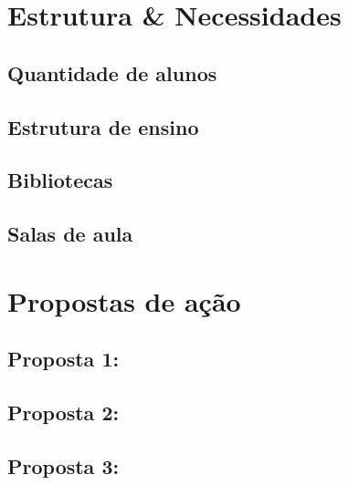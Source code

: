 \documentclass[a4paper,10pt]{report}
\begin{document}
        \section{Estrutura \& Necessidades}

            \subsection{Quantidade de alunos}

            \subsection{Estrutura de ensino}

            \subsection{Bibliotecas}

            \subsection{Salas de aula}

        \section{Propostas de ação}

            \subsection{Proposta 1:}

            \subsection{Proposta 2:}

            \subsection{Proposta 3:}
\end{document}

